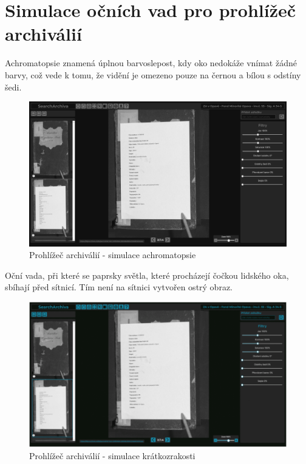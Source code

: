 \newpage
\section{Simulace očních vad pro prohlížeč archiválií}

Achromatopsie znamená úplnou barvoslepost, kdy oko nedokáže vnímat žádné barvy, což vede k tomu, že vidění je omezeno pouze na černou a bílou s odstíny šedi.
\begin{figure}[htbp]
\centering
    \includegraphics[scale=.35]{obrazky-figures/testing/figma-eye-defects/Gallery Page - Achromatopsia.png}
    \caption{Prohlížeč archiválií - simulace achromatopsie}
\end{figure}

\noindent
Oční vada, při které se paprsky světla, které procházejí čočkou lidského oka, sbíhají před sítnicí. Tím není na sítnici vytvořen ostrý obraz.
\begin{figure}[htbp]
\centering
    \includegraphics[scale=.35]{obrazky-figures/testing/figma-eye-defects/Gallery Page - Blurred.png}
    \caption{Prohlížeč archiválií - simulace krátkozrakosti}
\end{figure}

